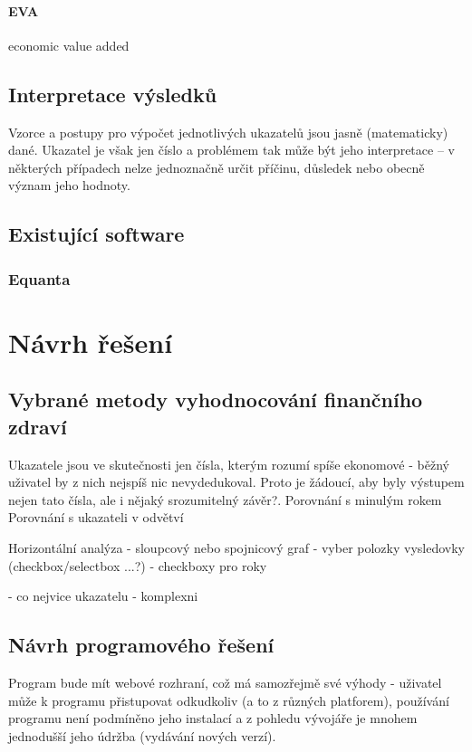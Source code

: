 \subsubsection{EVA}
economic value added



\section{Interpretace výsledků}
Vzorce a postupy pro výpočet jednotlivých ukazatelů jsou jasně (matematicky) dané. Ukazatel je však jen číslo a problémem tak může být jeho interpretace -- v některých případech nelze jednoznačně určit příčinu, důsledek nebo obecně význam jeho hodnoty. 

\section{Existující software}
\subsection{Equanta\sffamily\textregistered}

\chapter{Návrh řešení}
\section{Vybrané metody vyhodnocování finančního zdraví}
Ukazatele jsou ve skutečnosti jen čísla, kterým rozumí spíše ekonomové - běžný uživatel by z nich nejspíš nic nevydedukoval. Proto je žádoucí, aby byly výstupem nejen tato čísla, ale i nějaký srozumitelný závěr?.
Porovnání s minulým rokem
Porovnání s ukazateli v odvětví

Horizontální analýza
- sloupcový nebo spojnicový graf
- vyber polozky vysledovky (checkbox/selectbox ...?)
- checkboxy pro roky

- co nejvice ukazatelu - komplexni

\section{Návrh programového řešení}
Program bude mít webové rozhraní, což má samozřejmě své výhody - uživatel může k programu přistupovat odkudkoliv (a to z různých platforem), používání programu není podmíněno jeho instalací a z pohledu vývojáře je mnohem jednodušší jeho údržba (vydávání nových verzí).

